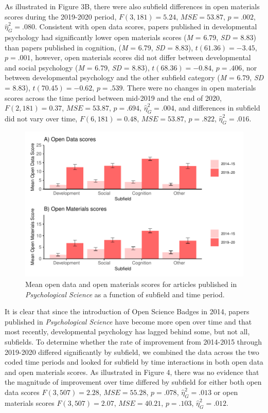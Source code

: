 \documentclass[
  english,
  man,floatsintext]{apa6}
\begin{document}
As illustrated in Figure 3B, there were also subfield differences in open materials scores during the 2019-2020 period, \(F(3, 181) = 5.24\), \(\mathit{MSE} = 53.87\), \(p = .002\), \(\hat{\eta}^2_G = .080\). Consistent with open data scores, papers published in developmental psychology had significantly lower open materials scores (\emph{M} = 6.79, \emph{SD} = 8.83) than papers published in cognition, (\emph{M} = 6.79, \emph{SD} = 8.83), \(t(61.36) = -3.45\), \(p = .001\), however, open materials scores did not differ between developmental and social psychology (\emph{M} = 6.79, \emph{SD} = 8.83), \(t(68.36) = -0.84\), \(p = .406\), nor between developmental psychology and the other subfield category (\emph{M} = 6.79, \emph{SD} = 8.83), \(t(70.45) = -0.62\), \(p = .539\). There were no changes in open materials scores across the time period between mid-2019 and the end of 2020, \(F(2, 181) = 0.37\), \(\mathit{MSE} = 53.87\), \(p = .694\), \(\hat{\eta}^2_G = .004\), and differences in subfield did not vary over time, \(F(6, 181) = 0.48\), \(\mathit{MSE} = 53.87\), \(p = .822\), \(\hat{\eta}^2_G = .016\).

\begin{figure}
\centering
\includegraphics{icd_special_issue_files/figure-latex/unnamed-chunk-5-1.pdf}
\caption{\label{fig:unnamed-chunk-5}Mean open data and open materials scores for articles published in \emph{Psychological Science} as a function of subfield and time period.}
\end{figure}

It is clear that since the introduction of Open Science Badges in 2014, papers published in \emph{Psychological Science} have become more open over time and that most recently, developmental psychology has lagged behind some, but not all, subfields. To determine whether the rate of improvement from 2014-2015 through 2019-2020 differed significantly by subfield, we combined the data across the two coded time periods and looked for subfield by time interactions in both open data and open materials scores. As illustrated in Figure 4, there was no evidence that the magnitude of improvement over time differed by subfield for either both open data scores \(F(3, 507) = 2.28\), \(\mathit{MSE} = 55.28\), \(p = .078\), \(\hat{\eta}^2_G = .013\) or open materials scores \(F(3, 507) = 2.07\), \(\mathit{MSE} = 40.21\), \(p = .103\), \(\hat{\eta}^2_G = .012\).
\end{document}
